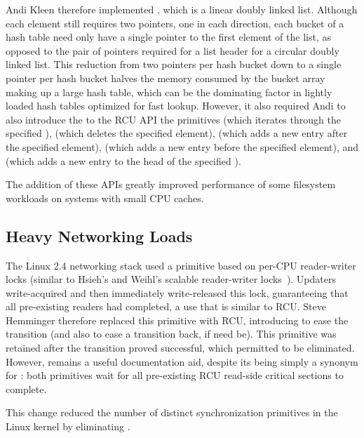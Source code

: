 Andi Kleen therefore implemented , which is a linear
doubly linked list.
Although each element still requires two pointers, one in each direction,
each bucket of a hash table need only have a single pointer to the first
element of the list, as opposed to the pair of pointers required for a
list header for a circular doubly linked list.
This reduction from two pointers per hash bucket down to a single pointer
per hash bucket halves the memory consumed by the bucket array making
up a large hash table, which can be the dominating factor in lightly
loaded hash tables optimized for fast lookup.
However, it also required Andi
to also introduce the to the RCU API the primitives
 (which iterates through the specified
),
 (which deletes the specified  element),
 (which adds a new entry after the specified
 element),
 (which adds a new entry before the specified
 element), and
 (which adds a new entry to the head of the
specified ).

The addition of these APIs greatly improved performance of some
filesystem workloads on systems with small CPU caches.

\subsection{Heavy Networking Loads}
\label{sec:app:rcuhist:Heavy Networking Loads}

The Linux 2.4 networking
stack used a  primitive based on per-CPU reader-writer locks
(similar to Hsieh's and Weihl's scalable reader-writer
locks~\cite{WilsonCHsieh92a}).
Updaters write-acquired and then immediately write-released this lock,
guaranteeing that all pre-existing readers had completed, a use that
is similar to RCU.
Steve Hemminger therefore replaced this  primitive with RCU,
introducing  to ease the transition (and
also to ease a transition back, if need be).
This primitive was retained after the transition proved successful,
which permitted  to be eliminated.
However,  remains a useful documentation aid,
despite its being simply a synonym for :
both primitives wait for all pre-existing RCU read-side critical
sections to complete.

This change reduced the number of distinct synchronization primitives
in the Linux kernel by eliminating .

